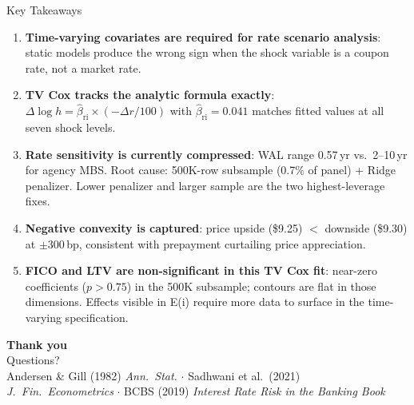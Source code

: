 \documentclass[10pt,aspectratio=169]{beamer}
\begin{document}
\begin{frame}{Key Takeaways}
    \begin{enumerate}\itemsep5pt
        \item \textbf{Time-varying covariates are required for rate scenario analysis}:
              static models produce the wrong sign when the shock variable is a coupon rate,
              not a market rate.
        \item \textbf{TV Cox tracks the analytic formula exactly}:
              $\Delta\log h = \hat\beta_{\text{ri}} \times (-\Delta r/100)$ with
              $\hat\beta_{\text{ri}} = 0.041$ matches fitted values at all seven shock levels.
        \item \textbf{Rate sensitivity is currently compressed}:
              WAL range 0.57\,yr vs.\ 2--10\,yr for agency MBS.
              Root cause: 500K-row subsample (0.7\% of panel) + Ridge penalizer.
              Lower penalizer and larger sample are the two highest-leverage fixes.
        \item \textbf{Negative convexity is captured}: price upside (\$9.25) $<$
              downside (\$9.30) at $\pm$300\,bp, consistent with prepayment curtailing
              price appreciation.
        \item \textbf{FICO and LTV are non-significant in this TV Cox fit}:
              near-zero coefficients ($p>0.75$) in the 500K subsample; contours are flat
              in those dimensions. Effects visible in E(i) require more data to surface
              in the time-varying specification.
    \end{enumerate}
\end{frame}

\begin{frame}[plain]
    \vspace*{2em}
    \begin{center}
        {\Huge \textbf{Thank you}}\\[1.5em]
        {\Large Questions?}\\[2.5em]
        \small
        Andersen \& Gill (1982) \textit{Ann.\ Stat.} $\cdot$
        Sadhwani et al.\ (2021) \textit{J.\ Fin.\ Econometrics} $\cdot$
        BCBS (2019) \textit{Interest Rate Risk in the Banking Book}
    \end{center}
\end{frame}
\end{document}
